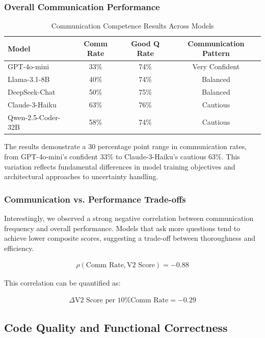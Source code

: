 \documentclass[conference]{IEEEtran}
\begin{document}
\subsubsection{Overall Communication Performance}

\begin{table}[ht]
\centering
\caption{Communication Competence Results Across Models}
\begin{tabular}{lccc}
\toprule
\textbf{Model} & \textbf{Comm Rate} & \textbf{Good Q Rate} & \textbf{Communication Pattern} \\
\midrule
GPT-4o-mini & 33\% & 74\% & Very Confident \\
Llama-3.1-8B & 40\% & 74\% & Balanced \\
DeepSeek-Chat & 50\% & 75\% & Balanced \\
Claude-3-Haiku & 63\% & 76\% & Cautious \\
Qwen-2.5-Coder-32B & 58\% & 74\% & Cautious \\
\bottomrule
\end{tabular}
\label{tab:communication_results}
\end{table}

The results demonstrate a 30 percentage point range in communication rates, from GPT-4o-mini's confident 33\% to Claude-3-Haiku's cautious 63\%. This variation reflects fundamental differences in model training objectives and architectural approaches to uncertainty handling.

\subsubsection{Communication vs. Performance Trade-offs}

Interestingly, we observed a strong negative correlation between communication frequency and overall performance. Models that ask more questions tend to achieve lower composite scores, suggesting a trade-off between thoroughness and efficiency.

\begin{align}
\rho(\text{Comm Rate}, \text{V2 Score}) = -0.88
\end{align}

This correlation can be quantified as:

\begin{align}
\Delta \text{V2 Score per 10\% Comm Rate} = -0.29
\end{align}

\subsection{Code Quality and Functional Correctness}
\end{document}
